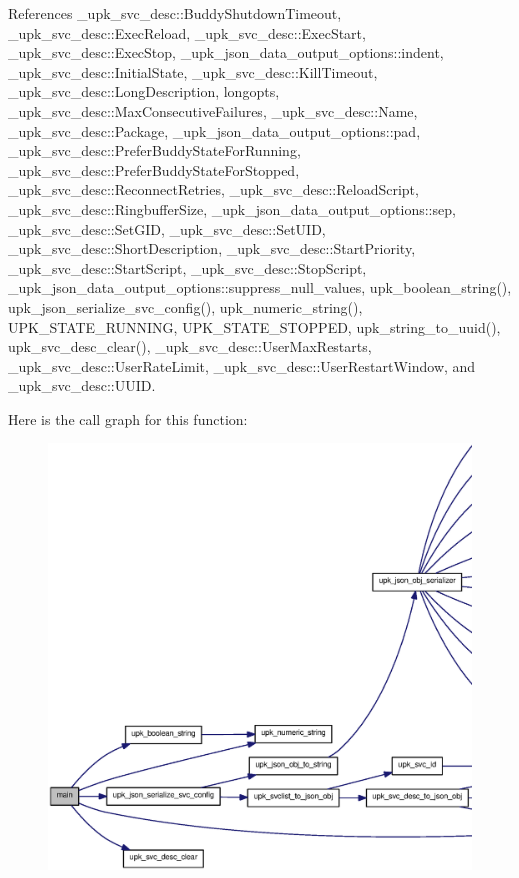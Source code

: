References \_\-upk\_\-svc\_\-desc::BuddyShutdownTimeout, \_\-upk\_\-svc\_\-desc::ExecReload, \_\-upk\_\-svc\_\-desc::ExecStart, \_\-upk\_\-svc\_\-desc::ExecStop, \_\-upk\_\-json\_\-data\_\-output\_\-options::indent, \_\-upk\_\-svc\_\-desc::InitialState, \_\-upk\_\-svc\_\-desc::KillTimeout, \_\-upk\_\-svc\_\-desc::LongDescription, longopts, \_\-upk\_\-svc\_\-desc::MaxConsecutiveFailures, \_\-upk\_\-svc\_\-desc::Name, \_\-upk\_\-svc\_\-desc::Package, \_\-upk\_\-json\_\-data\_\-output\_\-options::pad, \_\-upk\_\-svc\_\-desc::PreferBuddyStateForRunning, \_\-upk\_\-svc\_\-desc::PreferBuddyStateForStopped, \_\-upk\_\-svc\_\-desc::ReconnectRetries, \_\-upk\_\-svc\_\-desc::ReloadScript, \_\-upk\_\-svc\_\-desc::RingbufferSize, \_\-upk\_\-json\_\-data\_\-output\_\-options::sep, \_\-upk\_\-svc\_\-desc::SetGID, \_\-upk\_\-svc\_\-desc::SetUID, \_\-upk\_\-svc\_\-desc::ShortDescription, \_\-upk\_\-svc\_\-desc::StartPriority, \_\-upk\_\-svc\_\-desc::StartScript, \_\-upk\_\-svc\_\-desc::StopScript, \_\-upk\_\-json\_\-data\_\-output\_\-options::suppress\_\-null\_\-values, upk\_\-boolean\_\-string(), upk\_\-json\_\-serialize\_\-svc\_\-config(), upk\_\-numeric\_\-string(), UPK\_\-STATE\_\-RUNNING, UPK\_\-STATE\_\-STOPPED, upk\_\-string\_\-to\_\-uuid(), upk\_\-svc\_\-desc\_\-clear(), \_\-upk\_\-svc\_\-desc::UserMaxRestarts, \_\-upk\_\-svc\_\-desc::UserRateLimit, \_\-upk\_\-svc\_\-desc::UserRestartWindow, and \_\-upk\_\-svc\_\-desc::UUID.



Here is the call graph for this function:\nopagebreak
\begin{figure}[H]
\begin{center}
\leavevmode
\includegraphics[width=400pt]{upk_8c_a647f21a28344e1d9c643f4115516d7c9_cgraph}
\end{center}
\end{figure}




